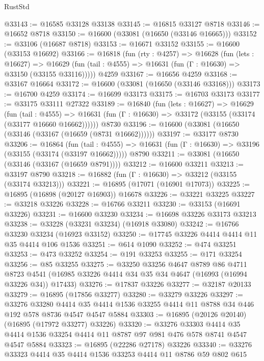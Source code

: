 \begin{lexlean}{RustStd}
\begin{coremodule}
@33143 := @16585 @33128 @33138
@33145 := @16815 @33127 @8718
@33146 := @16652 @8718
@33150 := @16600 (@33081 (@16650 (@33146 @16665)))
@33152 := @33106 (@16687 @8718)
@33153 := @16671 @33152
@33155 := @16600 (@33153 @16692)
@33166 := @16818
    (fun (rty : @4257) =>
    @16628
      (fun (lets : @16627) =>
      @16629 (fun (tail : @4555) => @16631 (fun (Γ : @16630) => @33150 (@33155 @33116)))))
    @4259
@33167 := @16656 @4259
@33168 := @33167 @16664
@33172 := @16600 (@33081 (@16650 (@33146 @33168)))
@33173 := @16700 @4259
@33174 := @16699 @33173
@33175 := @16703 @33173
@33177 := @33175 @33111 @27322
@33189 := @16840
    (fun (lets : @16627) =>
    @16629
      (fun (tail : @4555) =>
      @16631 (fun (Γ : @16630) => @33172 (@33155 (@33174 (@33177 @16660 @16662))))))
    @8730
@33196 := @16600 (@33081 (@16650 (@33146 (@33167 (@16659 (@8731 @16662))))))
@33197 := @33177 @8730
@33206 := @16864
    (fun (tail : @4555) => @16631 (fun (Γ : @16630) => @33196 (@33155 (@33174 (@33197 @16662)))))
    @8790
@33211 := @33081 (@16650 (@33146 (@33167 (@16659 @8791))))
@33212 := @16600 @33211
@33213 := @33197 @8790
@33218 := @16882 (fun (Γ : @16630) => @33212 (@33155 (@33174 @33213)))
@33221 := @16895 (@17071 (@16901 @17073))
@33225 := @16895 (@16898 (@20127 @16903)) @16678
@33226 := @33221 @33225
@33227 := @33218 @33226
@33228 := @16766 @33211
@33230 := @33153 (@16691 @33226)
@33231 := @16600 @33230
@33234 := @16698 @33226 @33173 @33213
@33238 := @33228 (@33231 @33234) (@16918 @33080)
@33242 := @16766 @33230 @33234 (@16923 @33152)
@33250 := @17745 @33226 @4414 @4414 @11 @35 @4414 @106 @1536
@33251 := @614 @1090
@33252 := @474 @33251
@33253 := @473 @33252
@33254 := @191 @33253
@33255 := @171 @33254
@33256 := @85 @33255
@33275 := @33250
    @33256
    @4647
    @8789
    @86
    @4711
    @8723
    @4541
    (@16985 @33226 @4414 @34 @35 @34 @4647 (@16993 (@16994 @33226 @34)) @17433)
@33276 := @17837 @33226
@33277 := @32187 @20133
@33279 := @16895 (@17856 @33277)
@33280 := @33279 @33226
@33297 := @33276
    @33280
    @4414
    @35
    @4414
    @1536
    @33255
    @4414
    @11
    @8788
    @34
    @446
    @192
    @578
    @8736
    @4547
    @4547
    @5884
@33303 := @16895 (@20126 @20140) (@16895 (@17972 @33277) @33226)
@33320 := @33276
    @33303
    @4414
    @35
    @4414
    @1536
    @33254
    @4414
    @11
    @8787
    @97
    @981
    @476
    @578
    @8741
    @4547
    @4547
    @5884
@33323 := @16895 (@22286 @27178) @33226
@33340 := @33276
    @33323
    @4414
    @35
    @4414
    @1536
    @33253
    @4414
    @11
    @8786
    @59
    @802
    @615

\end{coremodule}
\end{lexlean}
